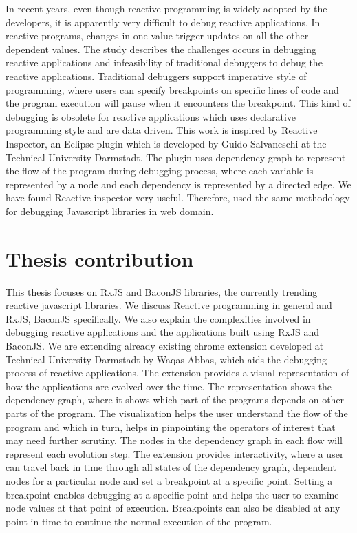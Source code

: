 In recent years, even though reactive programming is widely adopted by the developers, it is apparently very difficult to debug reactive applications. 
In reactive programs, changes in one value trigger updates on all the other dependent values. The study\cite{Salvaneschi:2016:DRP:2889160.2893174} describes the challenges occurs in debugging reactive applications and infeasibility of traditional debuggers to debug the reactive applications. Traditional debuggers support imperative style of programming, where users can specify breakpoints on specific lines of code and the program execution will pause when it encounters the breakpoint. 
This kind of debugging is obsolete for reactive applications which uses declarative programming style and are data driven. 
This work is inspired by Reactive Inspector\cite{reactiveInspector}, an Eclipse plugin which is developed by Guido Salvaneschi at the Technical University Darmstadt. 
The plugin uses dependency graph to represent the flow of the program during debugging process, where each variable is represented by a node and each dependency is represented by a directed edge.
We have found Reactive inspector very useful. Therefore, used the same methodology for debugging Javascript libraries in web domain.

\section{Thesis contribution}

This thesis focuses on RxJS and BaconJS libraries, the currently trending reactive javascript libraries. 
We discuss Reactive programming in general and RxJS, BaconJS specifically.
We also explain the complexities involved in debugging reactive applications and the applications built using RxJS and BaconJS. 
We are extending already existing chrome extension developed at Technical University Darmstadt by Waqas Abbas\cite{cri}, which aids the debugging process of reactive applications. 
The extension provides a visual representation of how the applications are evolved over the time. 
The representation shows the dependency graph, where it shows which part of the programs depends on other parts of the program. 
The visualization helps the user understand the flow of the program and which in turn, helps in pinpointing the operators of interest that may need further scrutiny. 
The nodes in the dependency graph in each flow will represent each evolution step. 
The extension provides interactivity, where a user can travel back in time through all states of the dependency graph, dependent nodes for a particular node and set a breakpoint at a specific point. 
Setting a breakpoint enables debugging at a specific point and helps the user to examine node values at that point of execution. 
Breakpoints can also be disabled at any point in time to continue the normal execution of the program.


